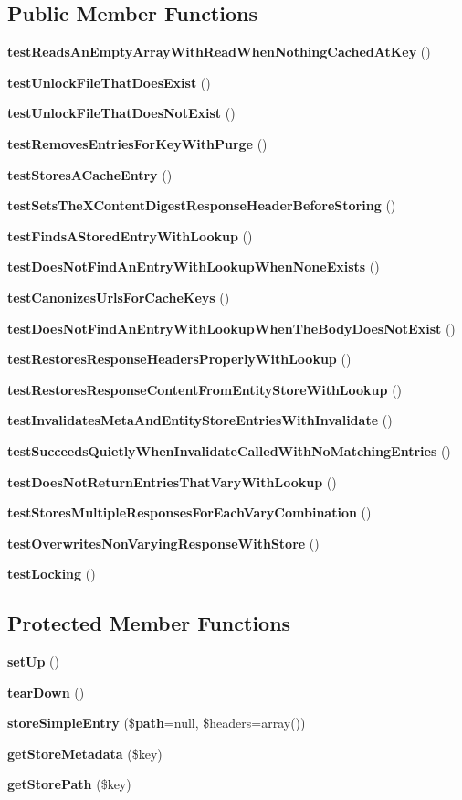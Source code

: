 \subsection*{Public Member Functions}
\begin{DoxyCompactItemize}
\item 
{\bf test\+Reads\+An\+Empty\+Array\+With\+Read\+When\+Nothing\+Cached\+At\+Key} ()
\item 
{\bf test\+Unlock\+File\+That\+Does\+Exist} ()
\item 
{\bf test\+Unlock\+File\+That\+Does\+Not\+Exist} ()
\item 
{\bf test\+Removes\+Entries\+For\+Key\+With\+Purge} ()
\item 
{\bf test\+Stores\+A\+Cache\+Entry} ()
\item 
{\bf test\+Sets\+The\+X\+Content\+Digest\+Response\+Header\+Before\+Storing} ()
\item 
{\bf test\+Finds\+A\+Stored\+Entry\+With\+Lookup} ()
\item 
{\bf test\+Does\+Not\+Find\+An\+Entry\+With\+Lookup\+When\+None\+Exists} ()
\item 
{\bf test\+Canonizes\+Urls\+For\+Cache\+Keys} ()
\item 
{\bf test\+Does\+Not\+Find\+An\+Entry\+With\+Lookup\+When\+The\+Body\+Does\+Not\+Exist} ()
\item 
{\bf test\+Restores\+Response\+Headers\+Properly\+With\+Lookup} ()
\item 
{\bf test\+Restores\+Response\+Content\+From\+Entity\+Store\+With\+Lookup} ()
\item 
{\bf test\+Invalidates\+Meta\+And\+Entity\+Store\+Entries\+With\+Invalidate} ()
\item 
{\bf test\+Succeeds\+Quietly\+When\+Invalidate\+Called\+With\+No\+Matching\+Entries} ()
\item 
{\bf test\+Does\+Not\+Return\+Entries\+That\+Vary\+With\+Lookup} ()
\item 
{\bf test\+Stores\+Multiple\+Responses\+For\+Each\+Vary\+Combination} ()
\item 
{\bf test\+Overwrites\+Non\+Varying\+Response\+With\+Store} ()
\item 
{\bf test\+Locking} ()
\end{DoxyCompactItemize}
\subsection*{Protected Member Functions}
\begin{DoxyCompactItemize}
\item 
{\bf set\+Up} ()
\item 
{\bf tear\+Down} ()
\item 
{\bf store\+Simple\+Entry} (\${\bf path}=null, \$headers=array())
\item 
{\bf get\+Store\+Metadata} (\$key)
\item 
{\bf get\+Store\+Path} (\$key)
\end{DoxyCompactItemize}
